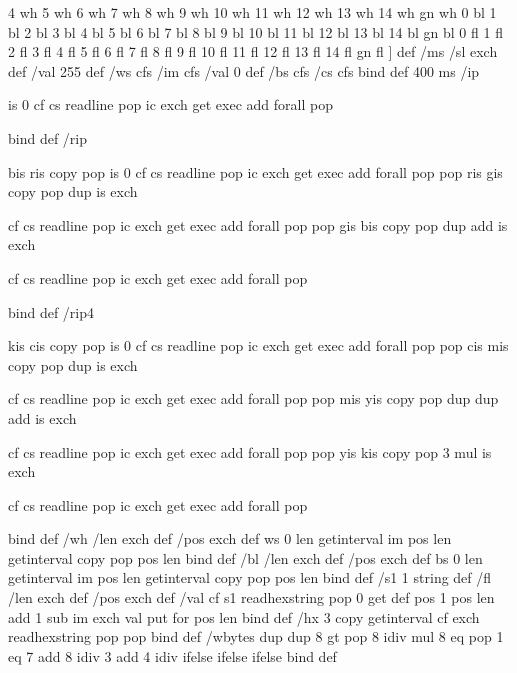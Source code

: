 	{4 wh} {5 wh} {6 wh} {7 wh} {8 wh} {9 wh} {10 wh} {11 wh} {12 wh}
	{13 wh} {14 wh} {gn wh} {0 bl} {1 bl} {2 bl} {3 bl} {4 bl} {5 bl} {6 bl}
	{7 bl} {8 bl} {9 bl} {10 bl} {11 bl} {12 bl} {13 bl} {14 bl} {gn bl}
	{0 fl} {1 fl} {2 fl} {3 fl} {4 fl} {5 fl} {6 fl} {7 fl} {8 fl} {9 fl}
	{10 fl} {11 fl} {12 fl} {13 fl} {14 fl} {gn fl}
	] def
/ms { 
	/sl exch def 
	/val 255 def 
	/ws cfs 
	/im cfs 
	/val 0 def 
	/bs cfs 
	/cs cfs 
	} bind def
400 ms 
/ip { 
	is 
	0 
	cf cs readline pop 
	{	ic exch get exec 
		add 
		} forall 
	pop 
	
	} bind def
/rip { 
	   
	  
	  bis ris copy pop 
      is
      0
      cf cs readline pop 
      {       ic exch get exec 
              add 
              } forall 
	  pop pop 
	  ris gis copy pop 
	  dup is exch 
	  
      cf cs readline pop 
      {       ic exch get exec 
              add 
              } forall 
	  pop pop
	  gis bis copy pop 
	  dup add is exch 
	  
      cf cs readline pop 
      {       ic exch get exec 
              add 
              } forall 
      pop 
      
      } bind def
/rip4 { 
	   
	  
	  kis cis copy pop 
      is
      0
      cf cs readline pop 
      {       ic exch get exec 
              add 
              } forall 
	  pop pop 
	  cis mis copy pop 
	  dup is exch 
	  
      cf cs readline pop 
      {       ic exch get exec 
              add 
              } forall 
	  pop pop
	  mis yis copy pop 
	  dup dup add is exch 
	  
      cf cs readline pop 
      {       ic exch get exec 
              add 
              } forall 
	  pop pop
	  yis kis copy pop 
	  3 mul is exch 
	  
      cf cs readline pop 
      {       ic exch get exec 
              add 
              } forall 
      pop 
      
      } bind def
/wh { 
	/len exch def 
	/pos exch def 
	ws 0 len getinterval im pos len getinterval copy pop
	pos len 
	} bind def
/bl { 
	/len exch def 
	/pos exch def 
	bs 0 len getinterval im pos len getinterval copy pop
	pos len 
	} bind def
/s1 1 string def
/fl { 
	/len exch def 
	/pos exch def 
	/val cf s1 readhexstring pop 0 get def
	pos 1 pos len add 1 sub {im exch val put} for
	pos len 
	} bind def
/hx { 
	3 copy getinterval 
	cf exch readhexstring pop pop 
	} bind def
/wbytes { 
      dup dup
      8 gt { pop 8 idiv mul }
      { 8 eq {pop} {1 eq {7 add 8 idiv} {3 add 4 idiv} ifelse} ifelse } ifelse
	} bind def
